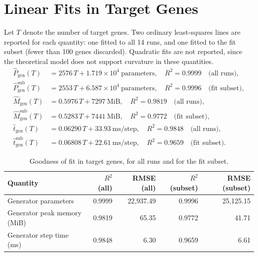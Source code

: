 \documentclass[11pt]{article}
\begin{document}
\section{Linear Fits in Target Genes}\label{sec:fits}
Let $T$ denote the number of target genes. Two ordinary least-squares lines are reported for each quantity: one fitted to all 14 runs, and one fitted to the fit subset (fewer than 100 genes discarded). Quadratic fits are not reported, since the theoretical model does not support curvature in these quantities.
\begin{align}
\widehat{P}_{\mathrm{gen}}(T) &= 2576\,T + 1.719\times10^{4}\ \mathrm{parameters},\quad R^2=0.9999 \quad\text{(all runs)}, \\
\widehat{P}_{\mathrm{gen}}^{\mathrm{sub}}(T) &= 2553\,T + 6.587\times10^{4}\ \mathrm{parameters},\quad R^2=0.9996 \quad\text{(fit subset)}, \\
\widehat{M}_{\mathrm{gen}}(T) &= 0.5976\,T + 7297\ \mathrm{MiB},\quad R^2=0.9819 \quad\text{(all runs)}, \\
\widehat{M}_{\mathrm{gen}}^{\mathrm{sub}}(T) &= 0.5283\,T + 7441\ \mathrm{MiB},\quad R^2=0.9772 \quad\text{(fit subset)}, \\
\widehat{t}_{\mathrm{gen}}(T) &= 0.06290\,T + 33.93\ \mathrm{ms/step},\quad R^2=0.9848 \quad\text{(all runs)}, \\
\widehat{t}_{\mathrm{gen}}^{\mathrm{sub}}(T) &= 0.06808\,T + 22.61\ \mathrm{ms/step},\quad R^2=0.9659 \quad\text{(fit subset)}.
\end{align}
\begin{table}[H]\centering
\caption{Goodness of fit in target genes, for all runs and for the fit subset.}
\label{tab:fits}
\begin{tabular}{lrrrr}\toprule Quantity & $R^2$ (all) & RMSE (all) & $R^2$ (subset) & RMSE (subset) \\ \midrule
Generator parameters & 0.9999 & 22,937.49 & 0.9996 & 25,125.15 \\
Generator peak memory (MiB) & 0.9819 & 65.35 & 0.9772 & 41.71 \\
Generator step time (ms) & 0.9848 & 6.30 & 0.9659 & 6.61 \\
\bottomrule\end{tabular}\end{table}
\end{document}
